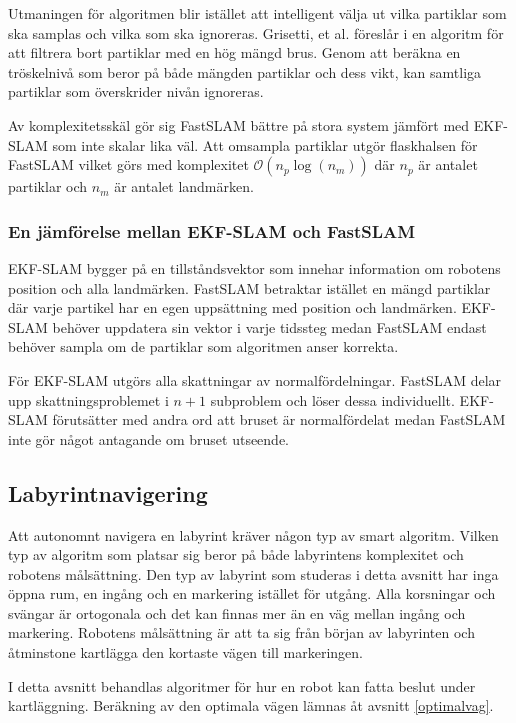 \documentclass[11pt]{article}
\begin{document}
\begin{flushleft}
Utmaningen för algoritmen blir istället att intelligent välja ut vilka partiklar som ska samplas och vilka som ska ignoreras. Grisetti, et al. föreslår i \cite{reo} en algoritm för att filtrera bort partiklar med en hög mängd brus. Genom att beräkna en tröskelnivå som beror på både mängden partiklar och dess vikt, kan samtliga partiklar som överskrider nivån ignoreras. 

Av komplexitetsskäl gör sig FastSLAM bättre på stora system jämfört med EKF-SLAM som inte skalar lika väl. Att omsampla partiklar utgör flaskhalsen för FastSLAM vilket görs med komplexitet $\mathcal{O}\left(n_{p}\log\left(n_{m}\right)\right)$ där $n_p$ är antalet partiklar och $n_m$ är antalet landmärken.

\subsubsection{En jämförelse mellan EKF-SLAM och FastSLAM}
EKF-SLAM bygger på en tillståndsvektor som innehar information om robotens position och alla landmärken. FastSLAM betraktar istället en mängd partiklar där varje partikel har en egen uppsättning med position och landmärken. EKF-SLAM behöver uppdatera sin vektor i varje tidssteg medan FastSLAM endast behöver sampla om de partiklar som algoritmen anser korrekta. 

För EKF-SLAM utgörs alla skattningar av normalfördelningar. FastSLAM delar upp skattningsproblemet i $n + 1$ subproblem och löser dessa individuellt. EKF-SLAM förutsätter med andra ord att bruset är normalfördelat medan FastSLAM inte gör något antagande om bruset utseende.

\subsection{Labyrintnavigering}
\label{mapping}
Att autonomnt navigera en labyrint kräver någon typ av smart algoritm. Vilken typ av algoritm som platsar sig beror på både labyrintens komplexitet och robotens målsättning. Den typ av labyrint som studeras i detta avsnitt har inga öppna rum, en ingång och en markering istället för utgång. Alla korsningar och svängar är ortogonala och det kan finnas mer än en väg mellan ingång och markering. Robotens målsättning är att ta sig från början av labyrinten och åtminstone kartlägga den kortaste vägen till markeringen.

I detta avsnitt behandlas algoritmer för hur en robot kan fatta beslut under kartläggning. Beräkning av den optimala vägen lämnas åt avsnitt \ref{optimalvag}.


\end{flushleft}
\end{document}
